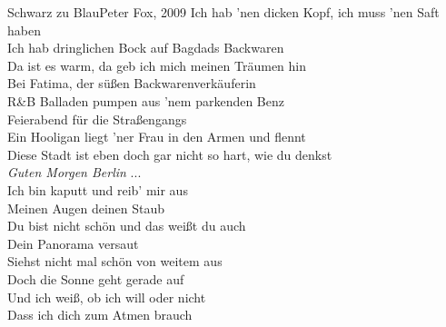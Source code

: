 \begin{lied}{Schwarz zu Blau}{Peter Fox, 2009}
Ich hab 'nen dicken Kopf, ich muss 'nen Saft haben\\
Ich hab dringlichen Bock auf Bagdads Backwaren\\
Da ist es warm, da geb ich mich meinen Träumen hin\\
Bei Fatima, der süßen Backwarenverkäuferin\\
R\&B Balladen pumpen aus 'nem parkenden Benz\\
Feierabend für die Straßengangs\\
Ein Hooligan liegt 'ner Frau in den Armen und flennt\\
Diese Stadt ist eben doch gar nicht so hart, wie du denkst\\

\textit{Guten Morgen Berlin} ...\\

Ich bin kaputt und reib' mir aus\\
Meinen Augen deinen Staub\\
Du bist nicht schön und das weißt du auch\\
Dein Panorama versaut\\
Siehst nicht mal schön von weitem aus\\
Doch die Sonne geht gerade auf\\
Und ich weiß, ob ich will oder nicht\\
Dass ich dich zum Atmen brauch
\end{lied}
